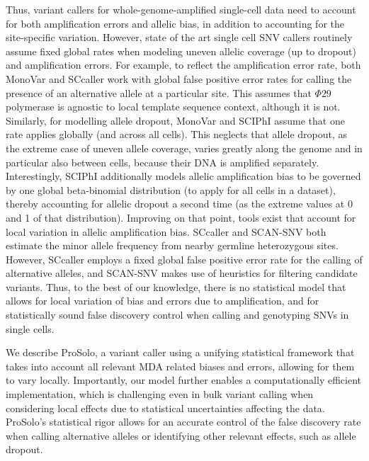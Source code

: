 \documentclass[fleqn,12pt,inline]{wlscirep}
\begin{document}
Thus, variant callers for whole-genome-amplified single-cell data need to account for both amplification errors and allelic bias, in addition to accounting for the site-specific variation.
However, state of the art single cell SNV callers routinely assume fixed global rates when modeling uneven allelic coverage (up to dropout) and amplification errors. 
For example, to reflect the amplification error rate, both MonoVar\cite{zafar_monovar:_2016} and SCcaller\cite{dong_accurate_2017} work with global false positive error rates for calling the presence of an alternative allele at a particular site.
This assumes that $\Phi29$ polymerase is agnostic to local template sequence context, although it is not\cite{de_paz_high-resolution_2018}.
Similarly, for modelling allele dropout, MonoVar\cite{zafar_monovar:_2016} and SCIPhI\cite{singer_single-cell_2018} assume that one rate applies globally (and across all cells).
This neglects that allele dropout, as the extreme case of uneven allele coverage, varies greatly along the genome and in particular also between cells, because their DNA is amplified separately.
Interestingly, SCIPhI\cite{singer_single-cell_2018} additionally models allelic amplification bias to be governed by one global beta-binomial distribution (to apply for all cells in a dataset), thereby accounting for allelic dropout a second time (as the extreme values at 0 and 1 of that distribution).
Improving on that point, tools exist that account for local variation in allelic amplification bias. SCcaller \cite{dong_accurate_2017} and SCAN-SNV\cite{luquette_identification_2019} both estimate the minor allele frequency from nearby germline heterozygous sites. 
However, SCcaller employs a fixed global false positive error rate for the calling of alternative alleles\cite{dong_accurate_2017}, and SCAN-SNV makes use of heuristics for filtering candidate variants\cite{luquette_identification_2019}.
Thus, to the best of our knowledge, there is no statistical model that allows for local variation of bias and errors due to amplification, and for statistically sound false discovery control when calling and genotyping SNVs in single cells.

We describe ProSolo, a variant caller using a unifying statistical framework that takes into account all relevant MDA related biases and errors, allowing for them to vary locally.
Importantly, our model further enables a computationally efficient implementation, which is challenging even in bulk variant calling when considering local effects due to statistical uncertainties affecting the data\cite{koster_enhancing_2019}.
ProSolo's statistical rigor allows for an accurate control of the false discovery rate when calling alternative alleles or identifying other relevant effects, such as allele dropout.
\end{document}
